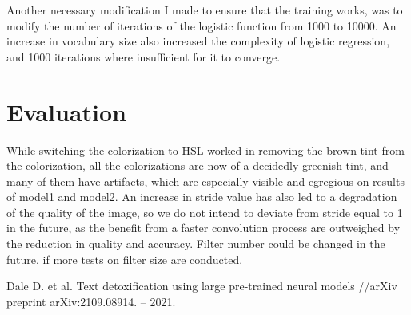 \documentclass[]{article}
\begin{document}
	Another necessary modification I made to ensure that the training works, was to modify the number of iterations of the logistic function from 1000 to 10000. An increase in vocabulary size also increased the complexity of logistic regression, and 1000 iterations where insufficient for it to converge. 
	
	\section{Evaluation}
	While switching the colorization to HSL worked in removing the brown tint from the colorization, all the colorizations are now of a decidedly greenish tint, and many of them have artifacts, which are especially visible and egregious on results of model1 and model2. An increase in stride value has also led to a degradation of the quality of the image, so we do not intend to deviate from stride equal to 1 in the future, as the benefit from a faster convolution process are outweighed by the reduction in quality and accuracy. Filter number could be changed in the future, if more tests on filter size are conducted.
	
	\begin{thebibliography}{99}
		 Dale D. et al. Text detoxification using large pre-trained neural models //arXiv preprint arXiv:2109.08914. – 2021.
	\end{thebibliography}
	
\end{document}
